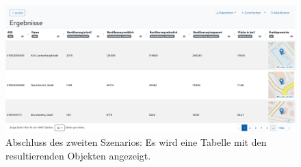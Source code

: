 \begin{figure}
  \centering
  \includegraphics[width=.95\textwidth]{assets/results-szenario-2.png}
  \caption{Abschluss des zweiten Szenarios: Es wird eine Tabelle mit den resultierenden Objekten angezeigt.}
  \label{fig:scenario-result}
\end{figure}

